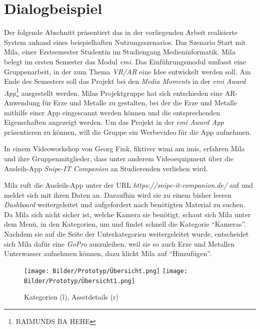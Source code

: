 \chapter{Dialogbeispiel}
\label{chapter-dialogbeispiel}

Der folgende Abschnitt präsentiert das in der vorliegenden Arbeit realisierte System anhand eines
beispielhaften Nutzungsszenarios. Das Szenario Start mit Mila, einer Erstsemester Studentin im
Studiengang Medieninformatik. Mila belegt im ersten Semester das Modul \textit{\ac{emi}}. Das
Einführungsmodul umfasst eine Gruppenarbeit, in der zum Thema \textit{VR/AR} eine Idee entwickelt
werden soll. Am Ende des Semesters soll das Projekt bei den \textit{Media Moments} in der
\textit{\ac{emi} Award App}\footnote{RAIMUNDS BA HEHE} ausgestellt werden. Milas Projektgruppe hat
sich entschieden eine AR-Anwendung für Erze und Metalle zu gestalten, bei der die Erze und Metalle
mithilfe einer App eingescannt werden können und die entsprechenden Eigenschaften angezeigt werden.
Um das Projekt in der \textit{\ac{emi} Award App} präsentieren zu können, will die Gruppe ein
Werbevideo für die App aufnehmen.

In einem Videoworkshop von Georg Fink, fiktiver \ac{wimi} am \ac{imis}, erfahren Mila und ihre
Gruppenmitglieder, dass unter anderem Videoequipment über die Ausleih-App \textit{Snipe-IT Companion} an
Studierenden verliehen wird. 

Mila ruft die Ausleih-App unter der URL \textit{https://snipe-it-companion.de/} auf und meldet
sich mit ihren  Daten an. Daraufhin wird sie zu einem bisher leeren \textit{Dashboard}
weitergeleitet und aufgefordert nach benötigten Material zu suchen. Da Mila sich nicht sicher ist,
welche Kamera sie benötigt, schaut sich Mila unter dem Menü, in den Kategorien, um und findet
schnell die Kategorie \enquote{Kameras}. Nachdem sie auf die Seite der Unterkategorien
weitergeleitet wurde, entscheidet sich Mila dafür eine \textit{GoPro} auszuleihen, weil sie so auch
Erze und Metallen Unterwasser aufnehmen können, dazu klickt Mila auf \enquote{Hinzufügen}.

\begin{figure}[h]
    \centering
    \texttt{[image: Bilder/Prototyp/Übersicht.png]}\hspace{2em}
    \texttt{[image: Bilder/Prototyp/Übersicht1.png]}
    \label{fig:p4}
    \caption[Mockup: Kategorien, Assets, Assetdetails]{Kategorien (l), Assetdetails (r)}
\end{figure}

